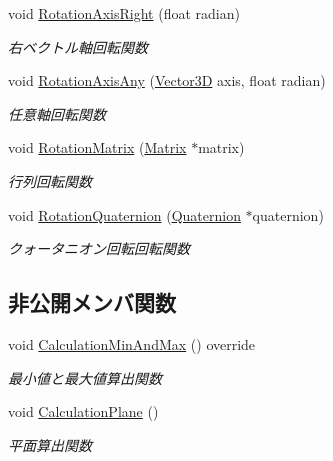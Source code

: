 \begin{DoxyCompactItemize}
void \mbox{\hyperlink{class_o_b_b_a09c39baa440c9cb9f10af2abc92e9e71}{Rotation\+Axis\+Right}} (float radian)
\begin{DoxyCompactList}\small\item\em 右ベクトル軸回転関数 \end{DoxyCompactList}\item 
void \mbox{\hyperlink{class_o_b_b_a3a3470e7813457b75948626d4a24e8e0}{Rotation\+Axis\+Any}} (\mbox{\hyperlink{class_vector3_d}{Vector3D}} axis, float radian)
\begin{DoxyCompactList}\small\item\em 任意軸回転関数 \end{DoxyCompactList}\item 
void \mbox{\hyperlink{class_o_b_b_ab08a8afd6b8d5c140e25d6f9665c9bf5}{Rotation\+Matrix}} (\mbox{\hyperlink{class_matrix}{Matrix}} $\ast$matrix)
\begin{DoxyCompactList}\small\item\em 行列回転関数 \end{DoxyCompactList}\item 
void \mbox{\hyperlink{class_o_b_b_a1501af5476ba75dbc4a85b4746352326}{Rotation\+Quaternion}} (\mbox{\hyperlink{_vector3_d_8h_a3ee38c9c46d9851e33a9a1113328dafc}{Quaternion}} $\ast$quaternion)
\begin{DoxyCompactList}\small\item\em クォータニオン回転回転関数 \end{DoxyCompactList}\end{DoxyCompactItemize}
\subsection*{非公開メンバ関数}
\begin{DoxyCompactItemize}
\item 
void \mbox{\hyperlink{class_o_b_b_a638080ada1be9bef353359358dba23bc}{Calculation\+Min\+And\+Max}} () override
\begin{DoxyCompactList}\small\item\em 最小値と最大値算出関数 \end{DoxyCompactList}\item 
void \mbox{\hyperlink{class_o_b_b_ac3f9bb13d4d941435bf53b3e2b070431}{Calculation\+Plane}} ()
\begin{DoxyCompactList}\small\item\em 平面算出関数 \end{DoxyCompactList}\end{DoxyCompactItemize}
